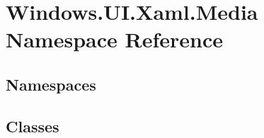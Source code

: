 \hypertarget{namespace_windows_1_1_u_i_1_1_xaml_1_1_media}{}\section{Windows.\+U\+I.\+Xaml.\+Media Namespace Reference}
\label{namespace_windows_1_1_u_i_1_1_xaml_1_1_media}
\subsection*{Namespaces}
\begin{DoxyCompactItemize}
\end{DoxyCompactItemize}
\subsection*{Classes}
